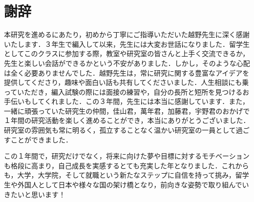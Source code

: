 \section*{謝辞}

本研究を進めるにあたり，初めから丁寧にご指導いただいた越野先生に深く感謝いたします．３年生で編入して以来，先生には大変お世話になりました．留学生としてこのクラスに参加する際，教室や研究室の皆さんと上手く交流できるか，先生と楽しい会話ができるかという不安がありました．しかし，そのような心配は全く必要ありませんでした．越野先生は，常に研究に関する豊富なアイデアを提供してくださり，趣味や面白い話も共有してくださいました．人生相談にも乗っていただき，編入試験の際には面接の練習や，自分の長所と短所を見つけるお手伝いもしてくれました．この３年間，先生には本当に感謝しています．また，一緒に頑張っていた研究生の仲間，佳山君，萬年君，加藤君，宇野君のおかげで１年間の研究活動を楽しく進めることができ，本当にありがとうございました．
研究室の雰囲気も常に明るく，孤立することなく温かい研究室の一員として過ごすことができました．

この１年間で，研究だけでなく，将来に向けた夢や目標に対するモチベーションも格段に高まり，自己成長を実感するとても充実した年となりました．これからも，大学，大学院，そして就職という新たなステップに自信を持って挑み，留学生や外国人として日本や様々な国の架け橋となり，前向きな姿勢で取り組んでいきたいと思います！
